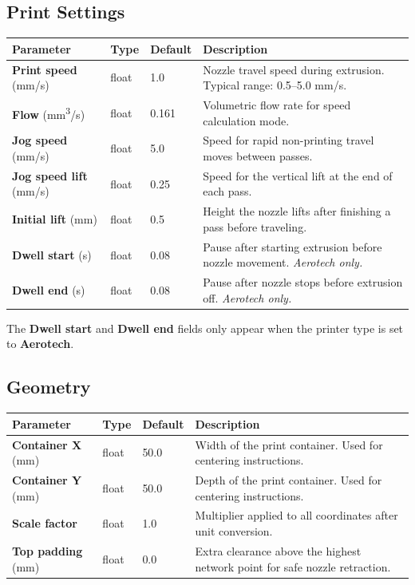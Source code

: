 \documentclass[11pt,letterpaper]{article}
\newcommand{\gui}[1]{\textcolor{guicolor}{\textsf{\textbf{#1}}}}
\begin{document}
\subsection{Print Settings}

\begin{tabularx}{\textwidth}{L{3.2cm} l l X}
\toprule
\textbf{Parameter} & \textbf{Type} & \textbf{Default} & \textbf{Description} \\
\midrule
\gui{Print speed} (mm/s) & float & 1.0 & Nozzle travel speed during extrusion. Typical range: 0.5--5.0 mm/s. \\
\gui{Flow} (mm\textsuperscript{3}/s) & float & 0.161 & Volumetric flow rate for speed calculation mode. \\
\gui{Jog speed} (mm/s) & float & 5.0 & Speed for rapid non-printing travel moves between passes. \\
\gui{Jog speed lift} (mm/s) & float & 0.25 & Speed for the vertical lift at the end of each pass. \\
\gui{Initial lift} (mm) & float & 0.5 & Height the nozzle lifts after finishing a pass before traveling. \\
\gui{Dwell start} (s) & float & 0.08 & Pause after starting extrusion before nozzle movement. \textit{Aerotech only.} \\
\gui{Dwell end} (s) & float & 0.08 & Pause after nozzle stops before extrusion off. \textit{Aerotech only.} \\
\bottomrule
\end{tabularx}

\begin{infobox}
The \gui{Dwell start} and \gui{Dwell end} fields only appear when
the printer type is set to \textbf{Aerotech}.
\end{infobox}

\subsection{Geometry}

\begin{tabularx}{\textwidth}{L{3.2cm} l l X}
\toprule
\textbf{Parameter} & \textbf{Type} & \textbf{Default} & \textbf{Description} \\
\midrule
\gui{Container X} (mm) & float & 50.0 & Width of the print container. Used for centering instructions. \\
\gui{Container Y} (mm) & float & 50.0 & Depth of the print container. Used for centering instructions. \\
\gui{Scale factor} & float & 1.0 & Multiplier applied to all coordinates after unit conversion. \\
\gui{Top padding} (mm) & float & 0.0 & Extra clearance above the highest network point for safe nozzle retraction. \\
\bottomrule
\end{tabularx}
\end{document}
